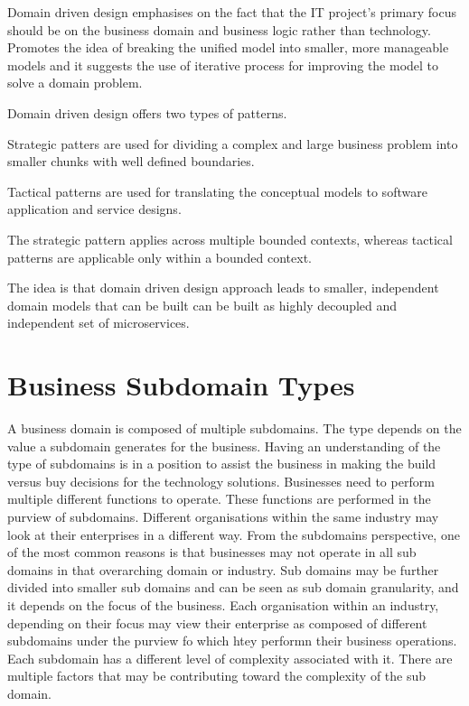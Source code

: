 \documentclass[a4paper, 11pt]{book}
\begin{document}
    Domain driven design emphasises on the fact that the IT project's primary focus should be on the business domain and business logic rather than technology.
    Promotes the idea of breaking the unified model into smaller, more manageable models and it suggests the use of iterative process for improving the model to solve a domain problem.

    Domain driven design offers two types of patterns.

    Strategic patters are used for dividing a complex and large business problem into smaller chunks with well defined boundaries.

    Tactical patterns are used for translating the conceptual models to software application and service designs.

    The strategic pattern applies across multiple bounded contexts, whereas tactical patterns are applicable only within a bounded context.

    The idea is that domain driven design approach leads to smaller, independent domain models that can be built can be built as highly decoupled and independent set of microservices.


    \section{Business Subdomain Types}
    A business domain is composed of multiple subdomains.
    The type depends on the value a subdomain generates for the business.
    Having an understanding of the type of subdomains is in a position to assist the business in making the build versus buy decisions for the technology solutions.
    Businesses need to perform multiple different functions to operate.
    These functions are performed in the purview of subdomains.
    Different organisations within the same industry may look at their enterprises in a different way.
    From the subdomains perspective, one of the most common reasons is that businesses may not operate in all sub domains in that overarching domain or industry.
    Sub domains may be further divided into smaller sub domains and can be seen as sub domain granularity, and it depends on the focus of the business.
    Each organisation within an industry, depending on their focus may view their enterprise as composed of different subdomains under the purview fo which htey performn their business operations.
    Each subdomain has a different level of complexity associated with it.
    There are multiple factors that may be contributing toward the complexity of the sub domain.
\end{document}
